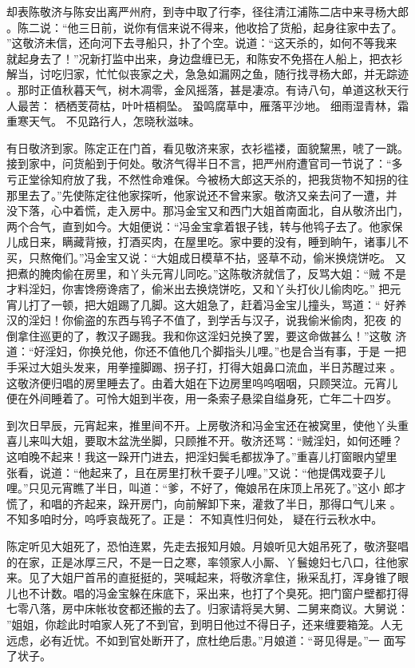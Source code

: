 却表陈敬济与陈安出离严州府，到寺中取了行李，径往清江浦陈二店中来寻杨大郎
。陈二说：“他三日前，说你有信来说不得来，他收拾了货船，起身往家中去了。
”这敬济未信，还向河下去寻船只，扑了个空。说道：“这天杀的，如何不等我来
就起身去了！”况新打监中出来，身边盘缠已无，和陈安不免搭在人船上，把衣衫
解当，讨吃归家，忙忙似丧家之犬，急急如漏网之鱼，随行找寻杨大郎，并无踪迹
。那时正值秋暮天气，树木凋零，金风摇落，甚是凄凉。有诗八句，单道这秋天行
人最苦：
栖栖芰荷枯，叶叶梧桐坠。
蛩鸣腐草中，雁落平沙地。
细雨湿青林，霜重寒天气。
不见路行人，怎晓秋滋味。

有日敬济到家。陈定正在门首，看见敬济来家，衣衫褴褛，面貌黧黑，唬了一跳。
接到家中，问货船到于何处。敬济气得半日不言，把严州府遭官司一节说了：“多
亏正堂徐知府放了我，不然性命难保。今被杨大郎这天杀的，把我货物不知拐的往
那里去了。”先使陈定往他家探听，他家说还不曾来家。敬济又亲去问了一遭，并
没下落，心中着慌，走入房中。那冯金宝又和西门大姐首南面北，自从敬济出门，
两个合气，直到如今。大姐便说：“冯金宝拿着银子钱，转与他鸨子去了。他家保
儿成日来，瞒藏背掖，打酒买肉，在屋里吃。家中要的没有，睡到晌午，诸事儿不
买，只熬俺们。”冯金宝又说：“大姐成日模草不拈，竖草不动，偷米换烧饼吃。
又把煮的腌肉偷在房里，和丫头元宵儿同吃。”这陈敬济就信了，反骂大姐：“贼
不是才料淫妇，你害馋痨谗痞了，偷米出去换烧饼吃，又和丫头打伙儿偷肉吃。”
把元宵儿打了一顿，把大姐踢了几脚。这大姐急了，赶着冯金宝儿撞头，骂道：“
好养汉的淫妇！你偷盗的东西与鸨子不值了，到学舌与汉子，说我偷米偷肉，犯夜
的倒拿住巡更的了，教汉子踢我。我和你这淫妇兑换了罢，要这命做甚么！”这敬
济道：“好淫妇，你换兑他，你还不值他几个脚指头儿哩。”也是合当有事，于是
一把手采过大姐头发来，用拳撞脚踢、拐子打，打得大姐鼻口流血，半日苏醒过来
。这敬济便归唱的房里睡去了。由着大姐在下边房里呜呜咽咽，只顾哭泣。元宵儿
便在外间睡着了。可怜大姐到半夜，用一条索子悬梁自缢身死，亡年二十四岁。

到次日早辰，元宵起来，推里间不开。上房敬济和冯金宝还在被窝里，使他丫头重
喜儿来叫大姐，要取木盆洗坐脚，只顾推不开。敬济还骂：“贼淫妇，如何还睡？
这咱晚不起来！我这一跺开门进去，把淫妇鬓毛都拔净了。”重喜儿打窗眼内望里
张看，说道：“他起来了，且在房里打秋千耍子儿哩。”又说：“他提偶戏耍子儿
哩。”只见元宵瞧了半日，叫道：“爹，不好了，俺娘吊在床顶上吊死了。”这小
郎才慌了，和唱的齐起来，跺开房门，向前解卸下来，灌救了半日，那得口气儿来
。不知多咱时分，呜呼哀哉死了。正是：
不知真性归何处，
疑在行云秋水中。

陈定听见大姐死了，恐怕连累，先走去报知月娘。月娘听见大姐吊死了，敬济娶唱
的在家，正是冰厚三尺，不是一日之寒，率领家人小厮、丫鬟媳妇七八口，往他家
来。见了大姐尸首吊的直挺挺的，哭喊起来，将敬济拿住，揪采乱打，浑身锥了眼
儿也不计数。唱的冯金宝躲在床底下，采出来，也打了个臭死。把门窗户壁都打得
七零八落，房中床帐妆奁都还搬的去了。归家请将吴大舅、二舅来商议。大舅说：
”姐姐，你趁此时咱家人死了不到官，到明日他过不得日子，还来缠要箱笼。人无
远虑，必有近忧。不如到官处断开了，庶杜绝后患。”月娘道：“哥见得是。”一
面写了状子。

